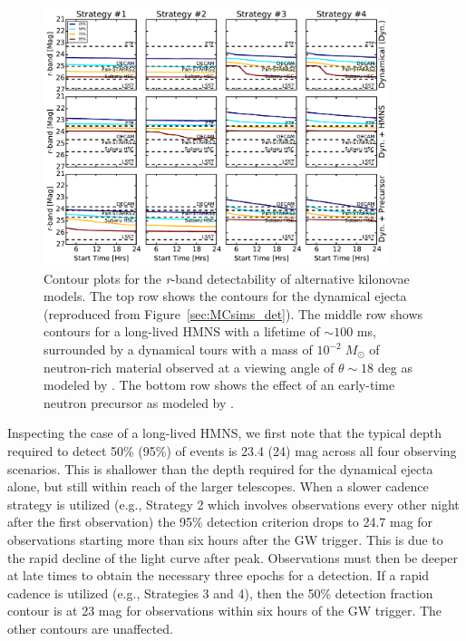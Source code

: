 \begin{figure}[t!]
\centering
\includegraphics[width=0.9\textwidth]{./figs/chapter2/ch2_f19.pdf}
\caption{Contour plots for the {\em r}-band detectability of alternative kilonovae models. The top row shows the contours for the dynamical ejecta (reproduced from Figure~\ref{sec:MCsims_det}). The middle row shows contours for a long-lived HMNS with a lifetime of $\sim 100$ ms, surrounded by a dynamical tours with a mass of $10^{-2}\;M_{\odot}$  of neutron-rich material observed at a viewing angle of $\theta \sim 18$ deg as modeled by \citet{Kasen+15}. The bottom row shows the effect of an early-time neutron precursor as modeled by \citet{Metzger+15}.}
\label{fig:altdet}
\end{figure}
   
Inspecting the case of a long-lived HMNS, we first note that the typical depth required to detect 50\% (95\%) of events is 23.4 (24) mag across all four observing scenarios. This is shallower than the depth required for the dynamical ejecta alone, but still within reach of the larger telescopes. When a slower cadence strategy is utilized (e.g., Strategy 2 which involves observations every other night after the first observation) the 95\% detection criterion drops to 24.7 mag for observations starting more than six hours after the GW trigger. This is due to the rapid decline of the light curve after peak. Observations must then be deeper at late times to obtain the necessary three epochs for a detection. If a rapid cadence is utilized (e.g., Strategies 3 and 4), then the 50\% detection fraction contour is at 23 mag for observations within six hours of the GW trigger. The other contours are unaffected. 

